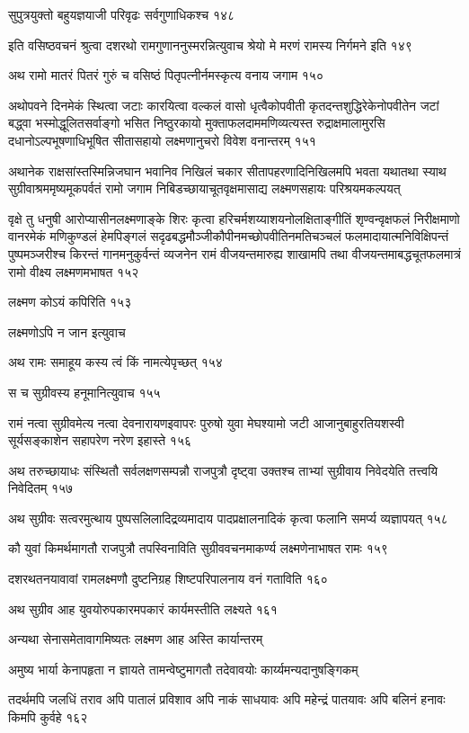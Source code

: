 सुपुत्रयुक्तो बहुयज्ञयाजी परिवृढः सर्वगुणाधिकश्च १४८

इति वसिष्ठवचनं श्रुत्वा दशरथो रामगुणाननुस्मरन्नित्युवाच श्रेयो मे मरणं रामस्य निर्गमने इति
 १४९

अथ रामो मातरं पितरं गुरुं च वसिष्ठं पितृपत्नीर्नमस्कृत्य वनाय जगाम १५०

अथोपवने दिनमेकं स्थित्वा जटाः कारयित्वा वल्कलं वासो धृत्वैकोपवीती कृतदन्तशुद्धिरेकेनोपवीतेन
जटां बद्ध्वा भस्मोद्धूलितसर्वाङ्गो भसित निष्ठुरकायो मुक्ताफलदाममणिव्यत्यस्त
रुद्राक्षमालामुरसि दधानोऽल्पभूषणाधिभूषित सीतासहायो लक्ष्मणानुचरो विवेश वनान्तरम् १५१

अथानेक राक्षसांस्तस्मिन्निजघान भवानिव निखिलं चकार सीतापहरणादिनिखिलमपि भवता
यथातथा स्याथ सुग्रीवाश्रममृष्यमूकपर्वतं रामो जगाम निबिडच्छायाचूतवृक्षमासाद्य
लक्ष्मणसहायः परिश्रयमकल्पयत्

वृक्षे तु धनुषी आरोप्यासीनलक्ष्मणाङ्के शिरः कृत्वा हरिचर्मशय्याशयनोलक्षिताङ्गीतिं शृण्वन्वृक्षफलं
निरीक्षमाणो वानरमेकं मणिकुण्डलं हेमपिङ्गलं सदृढबद्धमौञ्जीकौपीनमच्छोपवीतिनमतिचञ्चलं
फलमादायात्मनिविक्षिपन्तं पुष्पमञ्जरीश्च किरन्तं गानमनुकुर्वन्तं व्यजनेन रामं वीजयन्तमारुह्य
शाखामपि तथा वीजयन्तमाबद्धचूतफलमात्रं रामो वीक्ष्य लक्ष्मणमभाषत १५२

लक्ष्मण कोऽयं कपिरिति १५३

लक्ष्मणोऽपि न जान इत्युवाच

अथ रामः समाहूय कस्य त्वं किं नामत्येपृच्छत् १५४

स च सुग्रीवस्य हनूमानित्युवाच १५५

रामं नत्वा सुग्रीवमेत्य नत्वा देवनारायणइवापरः पुरुषो युवा मेघश्यामो जटी
आजानुबाहुरतियशस्वी सूर्यसङ्काशेन सहापरेण नरेण इहास्ते १५६

अथ तरुच्छायाधः संस्थितौ सर्वलक्षणसम्पन्नौ राजपुत्रौ दृष्ट्वा उक्तश्च ताभ्यां सुग्रीवाय
निवेदयेति तत्त्वयि निवेदितम् १५७

अथ सुग्रीवः सत्वरमुत्थाय पुष्पसलिलादिद्रव्यमादाय पादप्रक्षालनादिकं कृत्वा फलानि समर्प्य
व्यज्ञापयत् १५८

कौ युवां किमर्थमागतौ राजपुत्रौ तपस्विनाविति सुग्रीववचनमाकर्ण्य लक्ष्मणेनाभाषत रामः
 १५९

दशरथतनयावावां रामलक्ष्मणौ दुष्टनिग्रह शिष्टपरिपालनाय वनं गताविति १६०

अथ सुग्रीव आह युवयोरुपकारमपकारं कार्यमस्तीति लक्ष्यते १६१

अन्यथा सेनासमेतावागमिष्यतः लक्ष्मण आह अस्ति कार्यान्तरम्

अमुष्य भार्या केनापहृता न ज्ञायते तामन्वेष्टुमागतौ तदेवावयोः कार्य्यमन्यदानुषङ्गिकम्

तदर्थमपि जलधिं तराव अपि पातालं प्रविशाव अपि नाकं साधयावः अपि महेन्द्रं पातयावः अपि
बलिनं हनावः किमपि कुर्वहे १६२

